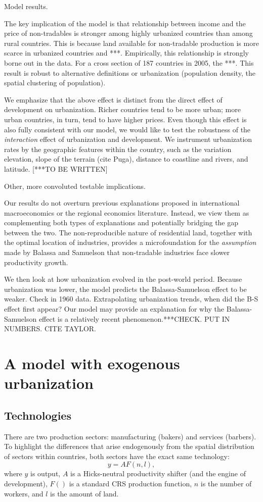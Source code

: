 \documentclass[12pt]{article}
\begin{document}
Model results.

The key implication of the model is that relationship between income and the price of non-tradables is stronger among highly urbanized countries than among rural countries. This is because land available for non-tradable production is more scarce in urbanized countries and ***. Empirically, this relationship is strongly borne out in the data. For a cross section of 187 countries in 2005, the ***. This result is robust to alternative definitions or urbanization (population density, the spatial clustering of population).

We emphasize that the above effect is distinct from the direct effect of development on urbanization. Richer countries tend to be more urban; more urban countries, in turn, tend to have higher prices. Even though this effect is also fully consistent with our model, we would like to test the robustness of the \emph{interaction} effect of urbanization and development. We instrument urbanization rates by the geographic features within the country, such as the variation elevation, slope of the terrain (cite Puga), distance to coastline and rivers, and latitude. [***TO BE WRITTEN]

Other, more convoluted testable implications.

Our results do not overturn previous explanations proposed in international macroeconomics or the regional economics literature. Instead, we view them as complementing both types of explanations and potentially bridging the gap between the two. The non-reproducible nature of residential land, together with the optimal location of industries, provides a microfoundation for the \emph{assumption} made by Balassa and Samuelson that non-tradable industries face slower productivity growth.

We then look at how urbanization evolved in the post-world period. Because urbanization was lower, the model predicts the Balassa-Samuelson effect to be weaker. Check in 1960 data. Extrapolating urbanization trends, when did the B-S effect first appear? Our model may provide an explanation for why the Balassa-Samuelson effect is a relatively recent phenomenon.***CHECK. PUT IN NUMBERS. CITE TAYLOR.



\section{A model with exogenous urbanization}
\subsection{Technologies}
There are two production sectors: manufacturing (bakers) and services (barbers). To highlight the differences that arise endogenously from the spatial distribution of sectors within countries, both sectors have the exact same technology:
\[
y = AF(n,l),
\]
where $y$ is output, $A$ is a Hicks-neutral productivity shifter (and the engine of development), $F()$ is a standard CRS production function, $n$ is the number of workers, and $l$ is the amount of land.
\end{document}
